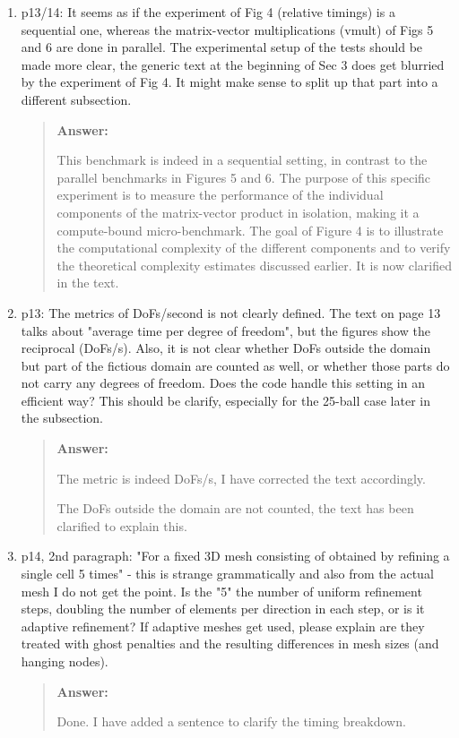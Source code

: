 \documentclass[11pt, a4paper]{article}
\newenvironment{answer}{%
      \begin{quote}%
            \color{blue!80!black}%
            \textbf{Answer:}%
            }{%
      \end{quote}%
}
\begin{document}
\begin{enumerate}[label=\textbullet, wide, labelindent=0pt]
      \item p13/14: It seems as if the experiment of Fig 4 (relative timings) is a sequential one, whereas the
            matrix-vector multiplications (vmult) of Figs 5 and 6 are done in parallel. The experimental setup of the
            tests should
            be made more clear, the generic text at the beginning of Sec 3 does get blurried by the experiment of Fig
            4.
            It might
            make sense to split up that part into a different subsection.
            \begin{answer}
                  This benchmark is indeed in a sequential setting, in contrast to the parallel benchmarks in Figures
                  5 and 6. The purpose of this specific experiment is to measure the performance of the individual
                  components of the
                  matrix-vector product in isolation, making it a compute-bound micro-benchmark. The goal of Figure 4
                  is to illustrate
                  the computational complexity of the different components and to verify the theoretical complexity
                  estimates discussed
                  earlier.
                  It is now clarified in the text.
            \end{answer}

      \item p13: The metrics of DoFs/second is not clearly defined. The text on page 13 talks about "average time per
            degree of freedom", but the figures show the reciprocal (DoFs/s). Also, it is not clear whether DoFs
            outside
            the domain
            but part of the fictious domain are counted as well, or whether those parts do not carry any degrees of
            freedom. Does
            the code handle this setting in an efficient way? This should be clarify, especially for the 25-ball case
            later in the
            subsection.
            \begin{answer}
                  The metric is indeed DoFs/s, I have corrected the text accordingly.

                  The DoFs outside the domain are not counted, the text has been clarified to explain this.
            \end{answer}

      \item p14, 2nd paragraph: "For a fixed 3D mesh consisting of obtained by refining a single cell 5 times" - this
            is strange grammatically and also from the actual mesh I do not get the point. Is the "5" the number of
            uniform
            refinement steps, doubling the number of elements per direction in each step, or is it adaptive refinement?
            If adaptive
            meshes get used, please explain are they treated with ghost penalties and the resulting differences in mesh
            sizes (and
            hanging nodes).
            \begin{answer}
                  Done. I have added a sentence to clarify the timing breakdown.
            \end{answer}


\end{enumerate}
\end{document}
